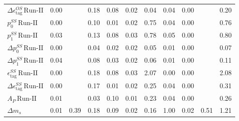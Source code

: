 \begin{tabular}{l  c  c  c  c  c  c  c  c  c  | c }
$\Delta \epsilon_{\text{tag}}^{OS} \, \text{Run-II}$ & 0.00 &  & 0.18 & 0.08 & 0.02 & 0.04 & 0.04 & 0.00 &  & 0.20 \\ 
$p_{0}^{SS} \, \text{Run-II}$ & 0.00 &  & 0.10 & 0.01 & 0.02 & 0.75 & 0.04 & 0.00 &  & 0.76 \\ 
$p_{1}^{SS} \, \text{Run-II}$ & 0.03 &  & 0.13 & 0.08 & 0.03 & 0.78 & 0.05 & 0.00 &  & 0.80 \\ 
$\Delta p_{0}^{SS} \, \text{Run-II}$ & 0.00 &  & 0.04 & 0.02 & 0.02 & 0.05 & 0.01 & 0.00 &  & 0.07 \\ 
$\Delta p_{1}^{SS} \, \text{Run-II}$ & 0.04 &  & 0.08 & 0.03 & 0.02 & 0.06 & 0.01 & 0.00 &  & 0.11 \\ 
$\epsilon_{\text{tag}}^{SS} \, \text{Run-II}$ & 0.00 &  & 0.18 & 0.08 & 0.03 & 2.07 & 0.00 & 0.00 &  & 2.08 \\ 
$\Delta \epsilon_{\text{tag}}^{SS} \, \text{Run-II}$ & 0.00 &  & 0.17 & 0.01 & 0.02 & 0.25 & 0.04 & 0.00 &  & 0.31 \\ 
$A_{P} \, \text{Run-II}$ & 0.01 &  & 0.03 & 0.10 & 0.01 & 0.23 & 0.04 & 0.00 &  & 0.26 \\ 
$\Delta m_{s}$ & 0.01 & 0.39 & 0.18 & 0.09 & 0.02 & 0.16 & 1.00 & 0.02 & 0.51 & 1.21 \\ 
\hline
\hline
\end{tabular}
